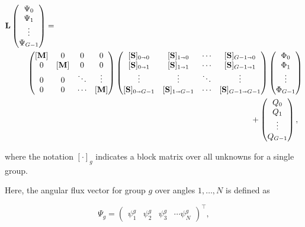 \documentclass{article} %
\newcommand{\sa}{\shortrightarrow}
\newcommand{\ve}[1]{\ensuremath{\mathbf{#1}}}
\newcommand{\fq}{\qquad\qquad\qquad\qquad}
\begin{document}
\begin{align}
    \ve{L}
    &\begin{pmatrix}
      \Psi_0 \\
      \Psi_1 \\
      \vdots   \\
      \Psi_{G-1}  \nonumber
    \end{pmatrix} = \\
    &\qquad\begin{pmatrix}
      [\ve{M}] & 0 & 0 & 0 \\
      0 & [\ve{M}] & 0 & 0 \\
      0 & 0 & \ddots & \vdots \\
      0 & 0 & \cdots & [\ve{M}] \\
    \end{pmatrix}
    \begin{pmatrix}
      [\ve{S}]_{0\sa0} & [\ve{S}]_{1\sa0} & \cdots & [\ve{S}]_{G-1\sa0} \\
      [\ve{S}]_{0\sa1} & [\ve{S}]_{1\sa1} & \cdots & [\ve{S}]_{G-1\sa1} \\
      \vdots & \vdots & \ddots & \vdots \\
      [\ve{S}]_{0\sa G-1} & [\ve{S}]_{1\sa G-1} & \cdots & [\ve{S}]_{G-1\sa G-1}
    \end{pmatrix}
    \begin{pmatrix}
      \Phi_0 \\
      \Phi_1 \\
      \vdots   \\
      \Phi_{G-1}
    \end{pmatrix}
    \\&\fq\fq\fq\qquad\qquad\qquad+
    \begin{pmatrix}
      Q_0 \\
      Q_1 \\
      \vdots  \\
      Q_{G-1}
    \end{pmatrix}, \nonumber
    \label{eq:matrix-transport}
\end{align}

\noindent where the notation $[\cdot]_g$ indicates a block matrix over all
unknowns for a single group.  

Here, the angular flux vector for group $g$ over angles $1,\ldots,N$ is defined
as

\begin{equation}
  \Psi_g = \begin{pmatrix}
    \psi^g_1 & \psi^g_2 & \psi^g_3 & \cdots \psi^g_N
  \end{pmatrix}^\top,
\label{psiv}
\end{equation}
\end{document}
